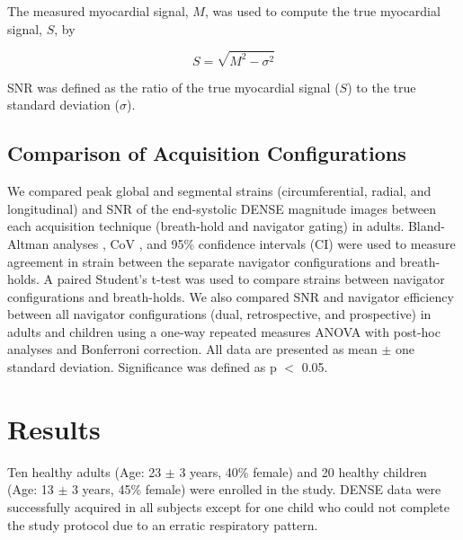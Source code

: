 	The measured myocardial signal, $M$, was used to compute the true myocardial signal, $S$, by

\begin{equation}
	S= \sqrt{M^2-\sigma^2}
\end{equation}

	SNR was defined as the ratio of the true myocardial signal ($S$) to the true standard deviation ($\sigma$).

\subsection{Comparison of Acquisition Configurations}
	We compared peak global and segmental strains (circumferential, radial, and longitudinal) and SNR of the end-systolic DENSE magnitude images between each acquisition technique (breath-hold and navigator gating) in adults. Bland-Altman analyses \cite{Bland1986}, CoV \cite{Haggerty2013}, and 95\% confidence intervals (CI) were used to measure agreement in strain between the separate navigator configurations and breath-holds. A paired Student's t-test was used to compare strains between navigator configurations and breath-holds. We also compared SNR and navigator efficiency between all navigator configurations (dual, retrospective, and prospective) in adults and children using a one-way repeated measures ANOVA with post-hoc analyses and Bonferroni correction. All data are presented as mean $\pm$ one standard deviation. Significance was defined as p $<$ 0.05.

\section{Results}
	Ten healthy adults (Age: 23 $\pm$ 3 years, 40\% female) and 20 healthy children (Age: 13 $\pm$ 3 years, 45\% female) were enrolled in the study. DENSE data were successfully acquired in all subjects except for one child who could not complete the study protocol due to an erratic respiratory pattern.

